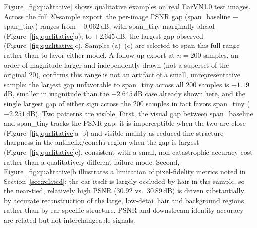 \documentclass[11pt]{article}
\begin{document}
Figure~\ref{fig:qualitative} shows qualitative examples on real EarVN1.0 test images. Across the full 20-sample export, the per-image PSNR gap (span\_baseline $-$ span\_tiny) ranges from $-0.062$\,dB, with span\_tiny marginally ahead (Figure~\ref{fig:qualitative}a), to $+2.645$\,dB, the largest gap observed (Figure~\ref{fig:qualitative}e). Samples (a)--(e) are selected to span this full range rather than to favor either model. A follow-up export at $n=200$ samples, an order of magnitude larger and independently drawn (not a superset of the original 20), confirms this range is not an artifact of a small, unrepresentative sample: the largest gap unfavorable to span\_tiny across all 200 samples is $+1.19$\,dB, smaller in magnitude than the $+2.645$\,dB case already shown here, and the single largest gap of either sign across the 200 samples in fact favors span\_tiny ($-2.251$\,dB). Two patterns are visible. First, the visual gap between span\_baseline and span\_tiny tracks the PSNR gap: it is imperceptible when the two are close (Figure~\ref{fig:qualitative}a--b) and visible mainly as reduced fine-structure sharpness in the antihelix/concha region when the gap is largest (Figure~\ref{fig:qualitative}e), consistent with a small, non-catastrophic accuracy cost rather than a qualitatively different failure mode. Second, Figure~\ref{fig:qualitative}b illustrates a limitation of pixel-fidelity metrics noted in Section~\ref{sec:related}: the ear itself is largely occluded by hair in this sample, so the near-tied, relatively high PSNR (30.92 vs.\ 30.89\,dB) is driven substantially by accurate reconstruction of the large, low-detail hair and background regions rather than by ear-specific structure. PSNR and downstream identity accuracy are related but not interchangeable signals.
\end{document}
